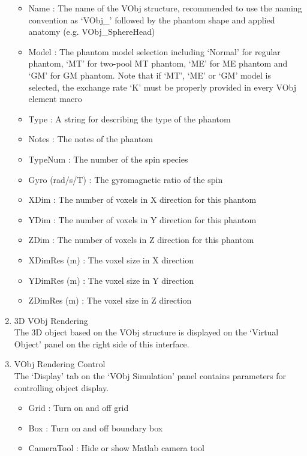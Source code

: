 \documentclass{book}%
\begin{document}
\begin{enumerate}
\begin{itemize}
	\item Name : The name of the VObj structure, recommended to use the naming convention as `VObj\_' followed by the phantom shape and applied anatomy (e.g. VObj\_SphereHead)
	\item Model : The phantom model selection including `Normal' for regular phantom, `MT' for two-pool MT phantom, `ME' for ME phantom and `GM' for GM phantom. Note that if `MT', `ME' or `GM' model is selected, the exchange rate `K' must be properly provided in every VObj element macro
	\item Type : A string for describing the type of the phantom
	\item Notes :  The notes of the phantom
	\item TypeNum : The number of the spin species
	\item Gyro (rad/s/T) : The gyromagnetic ratio of the spin
	\item XDim : The number of voxels in X direction for this phantom
	\item YDim : The number of voxels in Y direction for this phantom
	\item ZDim : The number of voxels in Z direction for this phantom
	\item XDimRes (m) : The voxel size in X direction
	\item YDimRes (m) : The voxel size in Y direction
	\item ZDimRes (m) : The voxel size in Z direction
\end{itemize}

	\item 3D VObj Rendering\\
The 3D object based on the VObj structure is displayed on the `Virtual Object' panel on the right side of this interface.

	\item VObj Rendering Control \\
The `Display' tab on the `VObj Simulation' panel contains parameters for controlling object display.

\begin{itemize}
	\item Grid : Turn on and off grid
	\item Box : Turn on and off boundary box
	\item CameraTool : Hide or show Matlab camera tool
\end{itemize}	

\end{enumerate}
\end{document}
